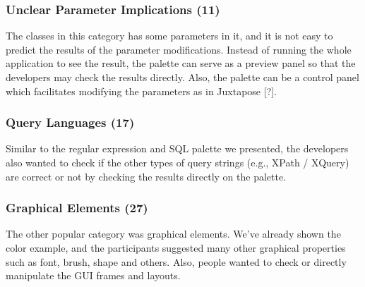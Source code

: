 \documentclass[conference]{IEEEtran}
\begin{document}
\subsubsection{Unclear Parameter Implications (11)}
The classes in this category has some parameters in it, and it is not easy to predict the results of the parameter modifications. Instead of running the whole application to see the result, the palette can serve as a preview panel so that the developers may check the results directly. Also, the palette can be a control panel which facilitates modifying the parameters as in Juxtapose [?].

%	

\subsubsection{Query Languages (17)}
Similar to the regular expression and SQL palette we presented, the developers also wanted to check if the other types of query strings (e.g., XPath / XQuery) are correct or not by checking the results directly on the palette.

%	

\subsubsection{Graphical Elements (27)}
The other popular category was graphical elements. We've already shown the color example, and the participants suggested many other graphical properties such as font, brush, shape and others. Also, people wanted to check or directly manipulate the GUI frames and layouts.
\end{document}
